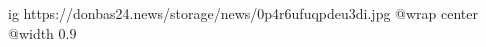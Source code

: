  
 
 
 
 

\ifcmt
  ig https://donbas24.news/storage/news/0p4r6ufuqpdeu3di.jpg
  @wrap center
  @width 0.9
\fi

